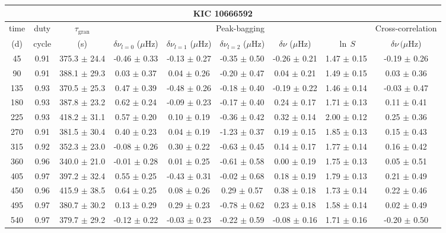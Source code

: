 \documentclass[twocolumn]{aastex61}%
\begin{document}
\begin{table*}[ht]\centering\fontsize{9.}{7.}\selectfont
\begin{tabular}{ccc|ccccc|c}
\multicolumn{9}{c}{KIC 10666592}\\ \hline\hline
time & duty & $\tau_\text{gran}$ &\multicolumn{5}{c|}{Peak-bagging}&Cross-correlation\\
(d)& cycle & (s)&$\delta\nu_{l=0}$ ($\mu$Hz) & $\delta\nu_{l=1}$ ($\mu$Hz) & $\delta\nu_{l=2}$ ($\mu$Hz) & $\delta\nu$ ($\mu$Hz)& $\ln\,S$ & $\delta\nu\,(\mu$Hz)\\\hline
45 & 0.91 & 375.3 $\pm$ 24.4 & -0.46 $\pm$ 0.33 & -0.13 $\pm$ 0.27 & -0.35 $\pm$ 0.50 & -0.26 $\pm$ 0.21 & 1.47 $\pm$ 0.15 & -0.19 $\pm$ 0.26\\
90 & 0.91 & 388.1 $\pm$ 29.3 & 0.03 $\pm$ 0.37 & 0.04 $\pm$ 0.26 & -0.20 $\pm$ 0.47 & 0.04 $\pm$ 0.21 & 1.49 $\pm$ 0.15 & 0.03 $\pm$ 0.36\\
135 & 0.93 & 370.5 $\pm$ 25.3 & 0.47 $\pm$ 0.39 & -0.48 $\pm$ 0.26 & -0.18 $\pm$ 0.40 & -0.19 $\pm$ 0.22 & 1.46 $\pm$ 0.14 & -0.03 $\pm$ 0.47\\
180 & 0.93 & 387.8 $\pm$ 23.2 & 0.62 $\pm$ 0.24 & -0.09 $\pm$ 0.23 & -0.17 $\pm$ 0.40 & 0.24 $\pm$ 0.17 & 1.71 $\pm$ 0.13 & 0.11 $\pm$ 0.41\\
225 & 0.93 & 418.2 $\pm$ 31.1 & 0.57 $\pm$ 0.20 & 0.10 $\pm$ 0.19 & -0.36 $\pm$ 0.42 & 0.32 $\pm$ 0.14 & 2.00 $\pm$ 0.12 & 0.25 $\pm$ 0.36\\
270 & 0.91 & 381.5 $\pm$ 30.4 & 0.40 $\pm$ 0.23 & 0.04 $\pm$ 0.19 & -1.23 $\pm$ 0.37 & 0.19 $\pm$ 0.15 & 1.85 $\pm$ 0.13 & 0.15 $\pm$ 0.43\\
315 & 0.92 & 352.3 $\pm$ 23.0 & -0.08 $\pm$ 0.26 & 0.30 $\pm$ 0.22 & -0.63 $\pm$ 0.45 & 0.14 $\pm$ 0.17 & 1.77 $\pm$ 0.14 & 0.16 $\pm$ 0.42\\
360 & 0.96 & 340.0 $\pm$ 21.0 & -0.01 $\pm$ 0.28 & 0.01 $\pm$ 0.25 & -0.61 $\pm$ 0.58 & 0.00 $\pm$ 0.19 & 1.75 $\pm$ 0.13 & 0.05 $\pm$ 0.51\\
405 & 0.97 & 397.2 $\pm$ 32.4 & 0.55 $\pm$ 0.25 & -0.43 $\pm$ 0.31 & -0.02 $\pm$ 0.68 & 0.18 $\pm$ 0.19 & 1.79 $\pm$ 0.13 & 0.21 $\pm$ 0.49\\
450 & 0.96 & 415.9 $\pm$ 38.5 & 0.64 $\pm$ 0.25 & 0.08 $\pm$ 0.26 & 0.29 $\pm$ 0.57 & 0.38 $\pm$ 0.18 & 1.73 $\pm$ 0.14 & 0.22 $\pm$ 0.46\\
495 & 0.97 & 380.7 $\pm$ 30.2 & 0.13 $\pm$ 0.29 & 0.29 $\pm$ 0.23 & -0.78 $\pm$ 0.62 & 0.23 $\pm$ 0.18 & 1.58 $\pm$ 0.14 & 0.02 $\pm$ 0.49\\
540 & 0.97 & 379.7 $\pm$ 29.2 & -0.12 $\pm$ 0.22 & -0.03 $\pm$ 0.23 & -0.22 $\pm$ 0.59 & -0.08 $\pm$ 0.16 & 1.71 $\pm$ 0.16 & -0.20 $\pm$ 0.50\\

\end{tabular}
\end{table*}
\end{document}
